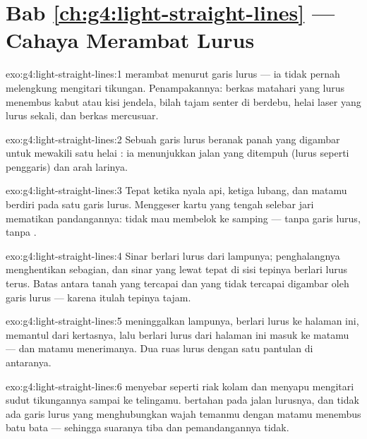 \section*{Bab \ref{ch:g4:light-straight-lines} --- Cahaya Merambat Lurus}

\begin{solution}{exo:g4:light-straight-lines:1}
 merambat menurut garis lurus --- ia tidak pernah melengkung
mengitari tikungan. Penampakannya: berkas matahari yang lurus menembus
kabut atau kisi jendela, bilah tajam senter di  berdebu, helai
laser yang lurus sekali, dan berkas mercusuar.
\end{solution}

\begin{solution}{exo:g4:light-straight-lines:2}
Sebuah garis lurus beranak panah yang digambar untuk mewakili satu
helai : ia menunjukkan jalan yang ditempuh  (lurus
seperti penggaris) dan arah larinya.
\end{solution}

\begin{solution}{exo:g4:light-straight-lines:3}
Tepat ketika nyala api, ketiga lubang, dan matamu berdiri pada satu
garis lurus. Menggeser kartu yang tengah selebar jari mematikan
pandangannya:  tidak mau membelok ke samping --- tanpa garis
lurus, tanpa .
\end{solution}

\begin{solution}{exo:g4:light-straight-lines:4}
Sinar berlari lurus dari lampunya; penghalangnya menghentikan
sebagian, dan sinar yang lewat tepat di sisi tepinya berlari lurus
terus. Batas antara tanah yang tercapai dan yang tidak tercapai
digambar oleh garis lurus --- karena itulah tepinya tajam.
\end{solution}

\begin{solution}{exo:g4:light-straight-lines:5}
 meninggalkan lampunya, berlari lurus ke halaman ini, memantul
dari kertasnya, lalu berlari lurus dari halaman ini masuk ke matamu
--- dan matamu menerimanya. Dua ruas lurus dengan satu pantulan di
antaranya.
\end{solution}

\begin{solution}{exo:g4:light-straight-lines:6}
 menyebar seperti riak kolam dan menyapu mengitari sudut
tikungannya sampai ke telingamu.  bertahan pada jalan lurusnya,
dan tidak ada garis lurus yang menghubungkan wajah temanmu dengan
matamu menembus batu bata --- sehingga suaranya tiba dan
pemandangannya tidak.
\end{solution}

